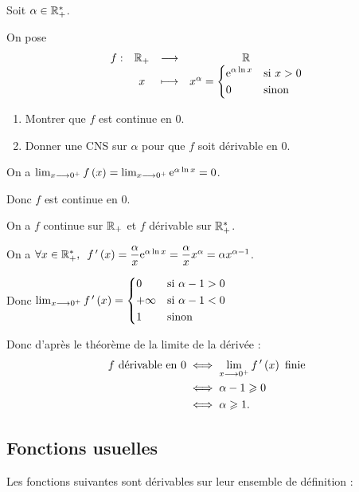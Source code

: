 \begin{exo}
Soit \(\alpha\in\mathbb{R}_+^*\).

On pose \[\begin{array}[t]{cccc}f : & \mathbb{R}_+ & \longrightarrow & \mathbb{R} \\ & x & \longmapsto & x^\alpha=\begin{dcases}\mathrm{e}^{\alpha\ln x} &\text{si }x>0 \\ 0 &\text{sinon}\end{dcases}\end{array}\]

\begin{enumerate}
\item Montrer que \(f\) est continue en \(0\). \\

\item Donner une CNS sur \(\alpha\) pour que \(f\) soit dérivable en \(0\).
\end{enumerate}
\end{exo}

\begin{corr}[1]
On a \(\lim_{x\longrightarrow0^+}f\left(x\right)=\lim_{x\longrightarrow0^+}\mathrm{e}^{\alpha\ln x}=0\).

Donc \(f\) est continue en \(0\).
\end{corr}

\begin{corr}[2]
On a \(f\) continue sur \(\mathbb{R}_+\) et \(f\) dérivable sur \(\mathbb{R}_+^*\).

On a \(\quantifs{\forall x\in\Rps}f\prim\paren{x}=\dfrac{\alpha}{x}\e{\alpha\ln x}=\dfrac{\alpha}{x}x^\alpha=\alpha x^{\alpha-1}\).

Donc \(\lim_{x\longrightarrow0^+}f^{\,\prime}\left(x\right)=\begin{dcases}0 &\text{si }\alpha-1>0 \\ +\infty &\text{si }\alpha-1<0 \\ 1 &\text{sinon}\end{dcases}\)

Donc d'après le théorème de la limite de la dérivée : \[\begin{aligned}
f\text{ dérivable en }0&\iff\lim_{x\longrightarrow0^+}f^{\,\prime}\left(x\right)\text{ finie} \\
&\iff\alpha-1\geqslant0 \\
&\iff\alpha\geqslant1.
\end{aligned}\]
\end{corr}

\subsection{Fonctions usuelles}

Les fonctions suivantes sont dérivables sur leur ensemble de définition :

